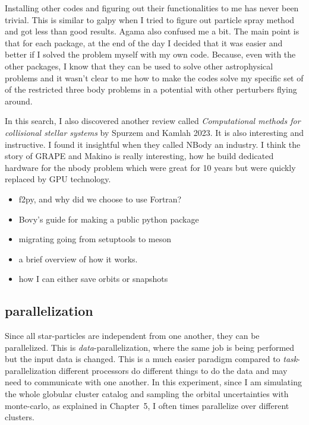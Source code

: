     Installing other codes and figuring out their functionalities to me has never been trivial. This is similar to galpy when I tried to figure out particle spray method and got less than good results. Agama also confused me a bit. The main point is that for each package, at the end of the day I decided that it was easier and better if I solved the problem myself with my own code. Because, even with the other packages, I know that they can be used to solve other astrophysical problems and it wasn't clear to me how to make the codes solve my specific set of of the restricted three body problems in a potential with other perturbers flying around. 

    In this search, I also discovered another review called \textit{Computational methods for collisional stellar systems} by Spurzem and Kamlah 2023. It is also interesting and instructive. I found it insightful when they called NBody an industry. I think the story of GRAPE and Makino is really interesting, how he build dedicated hardware for the nbody problem which were great for 10 years but were quickly replaced by GPU technology. 
    \begin{itemize}
        \item f2py, and why did we choose to use Fortran? 
        \item Bovy's guide for making a public python package
        \item migrating going from setuptools to meson
        \item a brief overview of how it works. 
        \item how I can either save orbits or snapshots
    \end{itemize}


        \subsection{parallelization}
            Since all star-particles are independent from one another, they can be parallelized. This is \textit{data}-parallelization, where the same job is being performed but the input data is changed. This is a much easier paradigm compared to \textit{task}-parallelization different processors do different things to do the data and may need to communicate with one another. In this experiment, since I am simulating the whole globular cluster catalog and sampling the orbital uncertainties with monte-carlo, as explained in Chapter~5, I often times parallelize over different clusters. 
            
